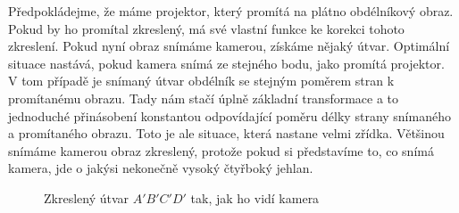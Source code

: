 \documentclass[twoside,12pt]{article}
\begin{document}
Předpokládejme, že máme projektor, který promítá na plátno obdélníkový obraz. Pokud by ho promítal zkreslený, má své vlastní funkce ke korekci tohoto zkreslení. Pokud nyní obraz snímáme kamerou, získáme nějaký útvar. Optimální situace nastává, pokud kamera snímá ze stejného bodu, jako promítá projektor. V tom případě je snímaný útvar obdélník se stejným poměrem stran k promítanému obrazu. Tady nám stačí úplně základní transformace a to jednoduché přinásobení konstantou odpovídající poměru délky strany snímaného a promítaného obrazu. Toto je ale situace, která nastane velmi zřídka. Většinou snímáme kamerou obraz zkreslený, protože pokud si představíme to, co snímá kamera, jde o jakýsi nekonečně vysoký čtyřboký jehlan.
\begin{figure}[ht]
 \begin{center}
 \end{center}
 \caption{Zkreslený útvar $A'B'C'D'$ tak, jak ho vidí kamera}
\end{figure}
\end{document}
